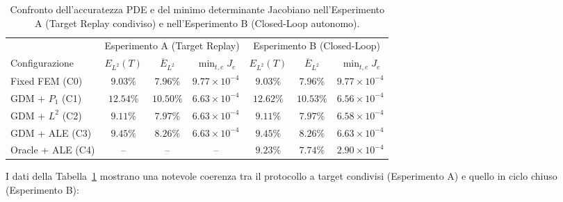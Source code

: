 \begin{table}[htbp]
\centering
\small
\setlength{\tabcolsep}{4.5pt}
\caption{Confronto dell'accuratezza PDE e del minimo determinante Jacobiano nell'Esperimento A (Target Replay condiviso) e nell'Esperimento B (Closed-Loop autonomo).}
\label{tab:final_accuracy}
\begin{tabular*}{\linewidth}{@{\extracolsep{\fill}}lcccccc@{}}
\toprule
& \multicolumn{3}{c}{Esperimento A (Target Replay)} & \multicolumn{3}{c}{Esperimento B (Closed-Loop)} \\
\cmidrule(lr){2-4} \cmidrule(lr){5-7}
Configurazione & $E_{L^2}(T)$ & $\overline{E}_{L^2}$ & $\min_{t,e} J_e$ & $E_{L^2}(T)$ & $\overline{E}_{L^2}$ & $\min_{t,e} J_e$ \\
\midrule
Fixed FEM (C0)    & $9.03\%$  & $7.96\%$  & $9.77\times10^{-4}$ & $9.03\%$  & $7.96\%$  & $9.77\times10^{-4}$ \\
GDM + $P_1$ (C1)  & $12.54\%$ & $10.50\%$ & $6.63\times10^{-4}$ & $12.62\%$ & $10.53\%$ & $6.56\times10^{-4}$ \\
GDM + $L^2$ (C2)  & $9.11\%$  & $7.97\%$  & $6.63\times10^{-4}$ & $9.11\%$  & $7.97\%$  & $6.58\times10^{-4}$ \\
GDM + ALE (C3)    & $9.45\%$  & $8.26\%$  & $6.63\times10^{-4}$ & $9.45\%$  & $8.26\%$  & $6.63\times10^{-4}$ \\
Oracle + ALE (C4) & --        & --        & --                  & $9.23\%$  & $7.74\%$  & $2.90\times10^{-4}$ \\
\bottomrule
\end{tabular*}
\end{table}

I dati della Tabella~\ref{tab:final_accuracy} mostrano una notevole coerenza tra il protocollo a target condivisi (Esperimento A) e quello in ciclo chiuso (Esperimento B):

